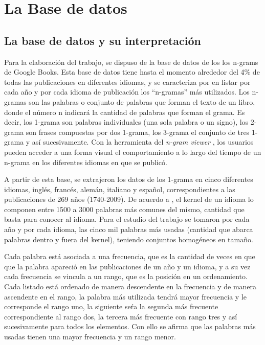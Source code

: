 \chapter{La Base de datos}

\section{La base de datos y su interpretación} %

Para la elaboración del trabajo,  se dispuso de la base de datos de los los n-grams de Google Books. Esta base de datos tiene hasta el momento alrededor del 4$\%$ de todas las publicaciones en diferentes idiomas,  y se caracteriza por en listar  por cada año y por cada idioma de publicación los “n-gramas” más utilizados.   Los n-gramas son las palabras o conjunto de palabras que forman el texto de un libro, donde el número n indicará la cantidad de palabras que forman el grama.  Es decir, los  1-grama son palabras individuales (una sola palabra o un signo), los 2-grama son frases compuestas por dos 1-grama, los 3-grama el conjunto de tres 1-grama y así sucesivamente.   Con la herramienta del \textit{n-gram viewer} \cite{ngramv}, los usuarios pueden acceder a una forma visual el comportamiento a lo largo del tiempo de un n-grama en los diferentes idiomas en que se publicó.  

A partir de esta base, se extrajeron los datos de los 1-grama en cinco diferentes idiomas, inglés, francés, alemán, italiano y español, correspondientes a las publicaciones de 269 años (1740-2009).  De acuerdo a \cite{iplosone},  el kernel de un idioma lo componen entre 1500 a 3000 palabras más comunes del mismo,  cantidad que basta para conocer al idioma.  Para el estudio del trabajo se tomaron por cada año y por cada idioma,  las cinco mil palabras más usadas (cantidad que abarca palabras dentro y fuera del kernel), teniendo conjuntos homogéneos en tamaño.

Cada palabra está asociada a una frecuencia, que es la cantidad de veces en que que la  palabra apareció en las publicaciones de un año y un idioma, y a su vez cada frecuencia se vincula a un rango, que es la posición en un ordenamiento.  Cada listado está ordenado de manera descendente en la frecuencia y de manera ascendente en el rango, la palabra más utilizada tendrá mayor frecuencia y le corresponde el rango uno,  la siguiente seŕa la segunda más frecuente correspondiente al rango dos,  la tercera más frecuente con rango tres y así sucesivamente para todos los elementos.  Con ello se afirma que las palabras más usadas tienen una mayor frecuencia y un rango menor. 


